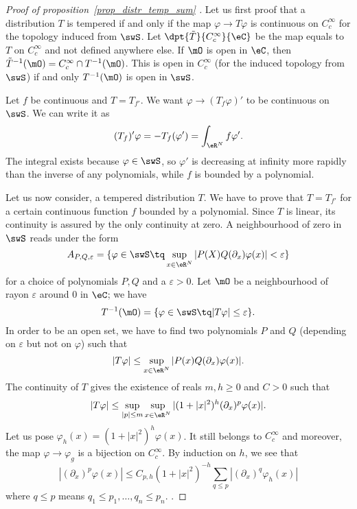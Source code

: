 \begin{proof}[Proof of proposition~\ref{prop_distr_temp_sum} ]
Let us first proof that a distribution $T$ is tempered if and only if the map $\varphi\to T\varphi$ is continuous on $ C^{\infty}_c$ for the topology induced from $\swS$. Let $\dpt{\tilde T}{ C^{\infty}_c}{\eC}$ be the map equals to $T$ on $ C^{\infty}_c$ and not defined anywhere else. If $\mO$ is open in $\eC$, then $\tilde T^{-1}(\mO)= C^{\infty}_c\cap T^{-1}(\mO)$. This is open in $ C^{\infty}_c$ (for the induced topology from $\swS$) if and only $T^{-1}(\mO)$ is open in $\swS$.


Let $f$ be continuous and $T=T_{f'}$. We want $\varphi\to(T_f\varphi)'$ to be continuous on $\swS$. We can write it as
\[
  (T_f)'\varphi=-T_f(\varphi')=\int_{\eR^N}f\varphi'.
\]
The integral exists because $\varphi\in\swS$, so $\varphi'$ is decreasing at infinity more rapidly than the inverse of any polynomials, while $f$ is bounded by a polynomial.

Let us now consider, a tempered distribution $T$. We have to prove that $T=T_{f'}$ for a certain continuous function $f$ bounded by a polynomial. Since $T$ is linear, its continuity is assured by the only continuity at zero. A neighbourhood of zero in $\swS$ reads under the form
\[
  A_{P,Q,\varepsilon}=\{ \varphi\in\swS\tq \sup_{x\in\eR^N}| P(X)Q(\partial_x)\varphi(x) |<\varepsilon \}
\]
for a choice of polynomials $P,Q$ and a $\varepsilon>0$. Let $\mO$ be a neighbourhood of rayon $\varepsilon$ around $0$ in $\eC$; we have
\[
  T^{-1}(\mO)=\{ \varphi\in\swS\tq | T\varphi |\leq \varepsilon \}.
\]
In order to be an open set, we have to find two polynomials $P$ and $Q$ (depending on $\varepsilon$ but not on $\varphi$) such that
\[
  | T\varphi |\leq \sup_{x\in\eR^N}| P(x)Q(\partial_x)\varphi(x) |.
\]
The continuity of $T$ gives the existence of reals $m,h\geq 0$ and $C>0$ such that
\[
  | T\varphi |\leq \sup_{| p |\leq m}\sup_{x\in\eR^N}| (1+| x |^2)^h(\partial_x)^p\varphi(x) |.
\]
Let us pose $\varphi_h(x)=(1+| x |^2)^h\varphi(x)$. It still belongs to $   C^{\infty}_c$ and moreover, the map $\varphi\to\varphi_g$ is a bijection on $ C^{\infty}_c$. By induction on $h$, we see that
\begin{equation}
  | (\partial_x)^p\varphi(x) |\leq C_{p,h}(1+| x |^2)^{-h}\sum_{q\leq p}| (\partial_x)^q\varphi_h(x) |
\end{equation}
where $q\leq p$ means $q_1\leq p_1,\ldots, q_n\leq p_n$.
 .

\end{proof}

